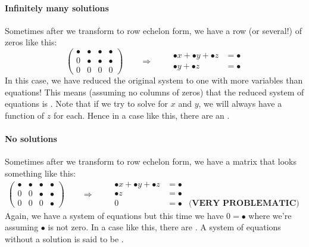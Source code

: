 \documentclass{ximera}
\begin{document}
\paragraph{Infinitely many solutions}

Sometimes after we transform to row echelon form, we have a row (or
several!) of zeros like this:
\[
  \left(
    \begin{array}{ccc|c}
      \bullet &   \bullet & \bullet & \bullet  \\
      0 &   \bullet & \bullet & \bullet \\
      0& 0  & 0 & 0
    \end{array}
  \right)
  \qquad\Longrightarrow\qquad
  \begin{aligned}
    \bullet x +  \bullet y + \bullet z &= \bullet \\
    \bullet y + \bullet z&= \bullet
  \end{aligned}
\]
In this case, we have reduced the original system to one with more
variables than equations!  This means (assuming no columns of zeros)
that the reduced system of equations is . Note
that if we try to solve for $x$ and $y$, we will always have a
function of $z$ for each. Hence in a case like this, there are an
.

\paragraph{No solutions}

Sometimes after we transform to row echelon form, we have a matrix
that looks something like this:
\[
  \left(
    \begin{array}{ccc|c}
      \bullet &   \bullet & \bullet & \bullet  \\
      0 &   0 & \bullet & \bullet \\
      0& 0  &  0 & \bullet
    \end{array}
  \right)
  \qquad\Longrightarrow\qquad
  \begin{aligned}
    \bullet x  + \bullet y + \bullet z &= \bullet & \\
    \bullet z&= \bullet & \\
    0 &=\bullet & \textbf{(VERY PROBLEMATIC)}
  \end{aligned}
\]
Again, we have a system of equations but this time we have
$0 = \bullet$ where we're assuming $\bullet$ is not zero. In a case like this,
there are . A system of equations without a solution
is said to be .
\end{document}
